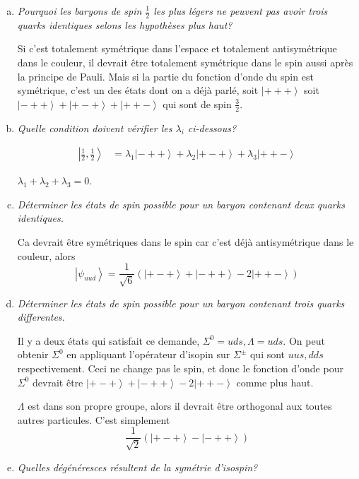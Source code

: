 \documentclass[10pt]{report}
\newcommand{\ket}[1]{\left|#1\right>}
\begin{document}
\begin{enumerate}[a)]
    \item \emph{Pourquoi les baryons de spin $\frac{1}{2}$ les plus l\'egers ne peuvent pas avoir trois quarks identiques selons les hypoth\`eses plus haut?}

        Si c'est totalement sym\'etrique dans l'espace et totalement antisym\'etrique dans le couleur, il devrait \^etre totalement sym\'etrique dans le spin aussi apr\`es la principe de Pauli. Mais si la partie du fonction d'onde du spin est sym\'etrique, c'est un des \'etats dont on a d\'ej\`a parl\'e, soit $\ket{+++}$ soit $\ket{-++} + \ket{+ - +} + \ket{+ + -}$ qui sont de spin $\frac{3}{2}$.

    \item \emph{Quelle condition doivent v\'erifier les $\lambda_i$ ci-dessous?}
        
        \begin{align}
            \ket{\frac{1}{2}, \frac{1}{2}} &= \lambda_1 \ket{ - + +} + \lambda_2\ket{+ - +} + \lambda_3\ket{+ + -}
        \end{align}

        $\lambda_1 + \lambda_2 + \lambda_3 = 0$. 
    \item \emph{D\'eterminer les \'etats de spin possible pour un baryon contenant deux quarks identiques.}
        
        Ca devrait \^etre sym\'etriques dans le spin car c'est d\'ej\`a antisym\'etrique dans le couleur, alors 
        $$\ket{\psi_{uud}} = \frac{1}{\sqrt{6}}\left( \ket{+ - +} + \ket{- + +} - 2\ket{+ + -} \right)$$

    \item \emph{D\'eterminer les \'etats de spin possible pour un baryon contenant trois quarks differentes.}

        Il y a deux \'etats qui satisfait ce demande, $\Sigma^0 = uds, \Lambda = uds$. On peut obtenir $\Sigma^0$ en appliquant l'op\'erateur d'isopin sur $\Sigma^{\pm}$ qui sont $uus, dds$ respectivement. Ceci ne change pas le spin, et donc le fonction d'onde pour $\Sigma^0$ devrait \^etre $\ket{+ - +} + \ket{- + +} - 2\ket{+ + -}$ comme plus haut.

        $\Lambda$ est dans son propre groupe, alors il devrait \^etre orthogonal aux toutes autres particules. C'est simplement 
        $$\frac{1}{\sqrt{2}}\left( \ket{+ - +} - \ket{- + +} \right)$$

    \item \emph{Quelles d\'eg\'en\'eresces r\'esultent de la sym\'etrie d'isospin?}


\end{enumerate}
\end{document}
